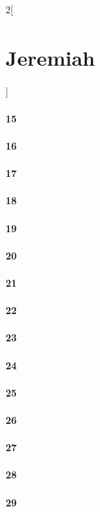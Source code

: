 \documentclass{book}
\begin{document}
\begin{multicols}{2}[\part{Jeremiah}]
\subsection*{15}
\subsection*{16}
\subsection*{17}
\subsection*{18}
\subsection*{19}
\subsection*{20}
\subsection*{21}
\subsection*{22}
\subsection*{23}
\subsection*{24}
\subsection*{25}
\subsection*{26}
\subsection*{27}
\subsection*{28}
\subsection*{29}

\end{multicols}
\end{document}
